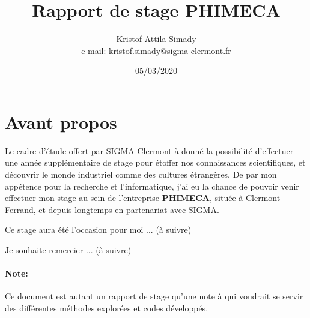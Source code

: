 \documentclass[a4paper,10pt]{article}
\begin{document}
%
   \title{Rapport de stage PHIMECA}

   \author{Kristof Attila Simady \\ e-mail: kristof.simady@sigma-clermont.fr}
          
   \date{05/03/2020}

   \maketitle
   
   \tableofcontents
 
  \newpage
    
\section*{Avant propos}
Le cadre d'étude offert par SIGMA Clermont à donné la possibilité d’effectuer
une année supplémentaire de stage pour étoffer nos connaissances scientifiques, 
et découvrir le monde industriel comme des cultures étrangères.
De par mon appétence pour la recherche et l'informatique, j'ai eu la chance de
pouvoir venir effectuer mon stage au sein de l'entreprise \textbf{PHIMECA}, 
située à Clermont-Ferrand, et depuis longtemps en partenariat avec SIGMA.

Ce stage aura été l'occasion pour moi ... (à suivre) 

Je souhaite remercier ... (à suivre)

\paragraph{Note:}
Ce document est autant un rapport de stage qu'une note à qui voudrait se 
servir des différentes méthodes explorées et codes développés.
\end{document}
